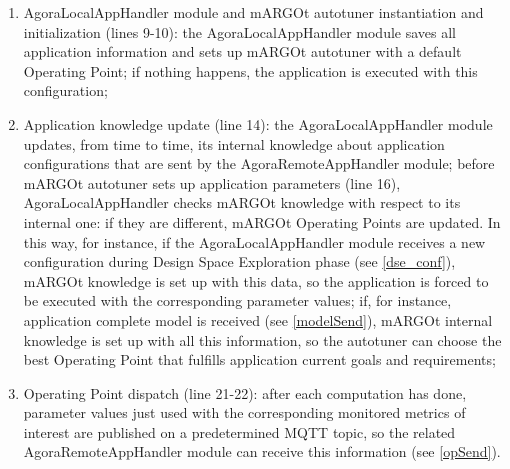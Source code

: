 \begin{enumerate}

    \item AgoraLocalAppHandler module and mARGOt autotuner instantiation and initialization (lines 9-10): the AgoraLocalAppHandler module saves all application information and sets up mARGOt autotuner with a default Operating Point; if nothing happens, the application is executed with this configuration;
    
    \item Application knowledge update (line 14): the AgoraLocalAppHandler module updates, from time to time, its internal knowledge about application configurations that are sent by the AgoraRemoteAppHandler module; before mARGOt autotuner sets up application parameters (line 16), AgoraLocalAppHandler checks mARGOt knowledge with respect to its internal one: if they are different, mARGOt Operating Points are updated. In this way, for instance, if the AgoraLocalAppHandler module receives a new configuration during Design Space Exploration phase (see \ref{dse_conf}), mARGOt knowledge is set up with this data, so the application is forced to be executed with the corresponding parameter values; if, for instance, application complete model is received (see \ref{modelSend}), mARGOt internal knowledge is set up with all this information, so the autotuner can choose the best Operating Point that fulfills application current goals and requirements;
    
    \item Operating Point dispatch (line 21-22): after each computation has done, parameter values just used with the corresponding monitored metrics of interest are published on a predetermined MQTT topic, so the related AgoraRemoteAppHandler module can receive this information (see \ref{opSend}).
    
\end{enumerate}
